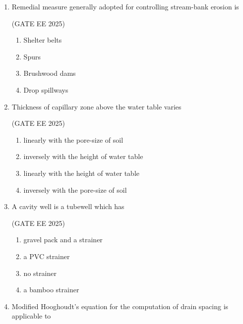 \documentclass[journal,12pt,onecolumn]{IEEEtran}
\theoremstyle{remark}
\begin{document}
\begin{enumerate}
\begin{multicols}{2}
\begin{enumerate}
    \item orthogonal to each other
    \item parallel to each other
    \item divergent to each other
    \item convergent to each other
\end{enumerate}
\end{multicols}

\item Remedial measure generally adopted for controlling stream-bank erosion is

\hfill(GATE EE 2025)

\begin{multicols}{2}
\begin{enumerate}
    \item Shelter belts
    \item Spurs
    \item Brushwood dams
    \item Drop spillways
\end{enumerate}
\end{multicols}

\item Thickness of capillary zone above the water table varies

\hfill(GATE EE 2025)

\begin{multicols}{2}
\begin{enumerate}
    \item linearly with the pore-size of soil
    \item inversely with the height of water table
    \item linearly with the height of water table
    \item inversely with the pore-size of soil
\end{enumerate}
\end{multicols}

\item A cavity well is a tubewell which has

\hfill(GATE EE 2025)

\begin{multicols}{2}
\begin{enumerate}
    \item gravel pack and a strainer
    \item a PVC strainer
    \item no strainer
    \item a bamboo strainer
\end{enumerate}
\end{multicols}
\newpage
\item Modified Hooghoudt's equation for the computation of drain spacing is applicable to


\end{enumerate}
\end{document}
